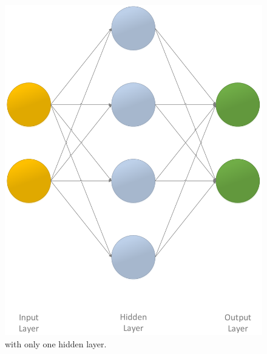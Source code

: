 \begin{figure}[!ht]
	\centering
	\begin{minipage}[b]{0.45\textwidth}
		\includegraphics[width=\textwidth]{img/ann_1h}
		\caption{ with only one hidden layer.}
		\label{fig:ann_1h}
	\end{minipage}
	\hfill
	\begin{minipage}[b]{0.45\textwidth}

\end{minipage}
\end{figure}
